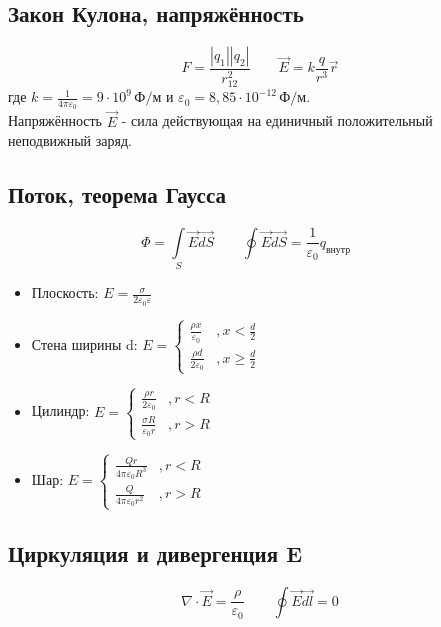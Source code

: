 \documentclass{article}
\begin{document}
\tableofcontents

\section{}
\subsection{Закон Кулона, напряжённость}
\[F = \frac{|q_1||q_2|}{r_{12}^2} \qquad \vec{E} = k\frac{q}{r^3}\vec{r}\]
где $ k=\frac{1}{4\pi\varepsilon_0}=9\cdot10^9 \,\text{Ф/м}$ и $\varepsilon_{0} = 8,85\cdot10^{-12} \,\text{Ф/м}$. \\
Напряжённость $\vec{E}$ - сила действующая на единичный положительный неподвижный заряд.
\subsection{Поток, теорема Гаусса}
\[
    \Phi=\int\limits_{S}\vec{E}\vec{dS} \qquad
    \oint\vec{E}\vec{dS}=\frac{1}{\varepsilon_{0}}q_\text{внутр} \qquad
\]
\begin{itemize}
    \item Плоскость: $E=\frac{\sigma}{2\varepsilon_{0}\varepsilon}$
    \item Стена ширины d: $E=\begin{cases}
                  \frac{\rho x}{\varepsilon_{0}}   & ,x<\frac{d}{2}   \\
                  \frac{\rho d}{2\varepsilon_{0}} & ,x\ge\frac{d}{2}
              \end{cases}$
    \item Цилиндр: $E=\begin{cases}
        \frac{\rho r}{2 \varepsilon_0} & ,r<R \\
        \frac{\sigma R}{\varepsilon_0 r} & ,r>R
    \end{cases}$
    \item Шар: $E=\begin{cases}
                  \frac{Qr}{4\pi\varepsilon_{0}R^3}  & ,r<R \\
                  \frac{Q}{4\pi\varepsilon_{0}r^{2}} & ,r>R
              \end{cases}$
\end{itemize}
\subsection{Циркуляция и дивергенция E}
\[
    \nabla\cdot\vec{E}=\frac{\rho}{\varepsilon_{0}} \qquad
    \oint \vec{E}\vec{dl}=0
\]
\end{document}
